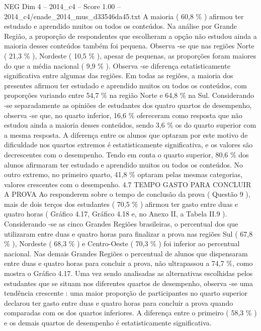 \begin{textsample}{NEG Dim 4 – 2014\_c4 – Score 1.00 – 2014\_c4/enade\_2014\_mus\_d33546da45.txt}
A maioria ( 60,8 \% ) afirmou ter estudado e aprendido muitos ou todos os conteúdos.
Na análise por Grande Região, a proporção de respondentes que escolheram a opção não estudou ainda a maioria desses conteúdos também foi pequena.
Observa -se que nas regiões Norte ( 21,3 \% ), Nordeste ( 10,5 \% ), apesar de pequenas, as proporções foram maiores do que a média nacional ( 9,9 \% ).
Observa -se diferença estatisticamente significativa entre algumas das regiões.
Em todas as regiões, a maioria dos presentes afirmou ter estudado e aprendido muitos ou todos os conteúdos, com proporções variando entre 54,7 \% na região Norte e 64,8 \% na Sul.
Considerando -se separadamente as opiniões de estudantes dos quatro quartos de desempenho, observa -se que, no quarto inferior, 16,6 \% ofereceram como resposta que não estudou ainda a maioria desses conteúdos, sendo 3,6 \% os do quarto superior com a mesma resposta.
A diferença entre os alunos que optaram por este motivo de dificuldade nos quartos extremos é estatisticamente significativa, e os valores são decrescentes com o desempenho.
Tendo em conta o quarto superior, 80,6 \% dos alunos afirmaram ter estudado e aprendido muitos ou todos os conteúdos.
No outro extremo, no primeiro quarto, 41,8 \% optaram pelas mesmas categorias, valores crescentes com o desempenho. 4.7 TEMPO GASTO PARA CONCLUIR A PROVA Ao responderem sobre o tempo de conclusão da prova ( Questão 9 ), mais de dois terços dos estudantes ( 70,5 \% ) afirmou ter gasto entre duas e quatro horas ( Gráfico 4.17, Gráfico 4.18 e, no Anexo II, a Tabela II.9 ).
Considerando -se as cinco Grandes Regiões brasileiras, o percentual dos que utilizaram entre duas e quatro horas para finalizar a prova nas regiões Sul ( 67,8 \% ), Nordeste ( 68,3 \% ) e Centro-Oeste ( 70,3 \% ) foi inferior ao percentual nacional.
Nas demais Grandes Regiões o percentual de alunos que dispensaram entre duas e quatro horas para concluir a prova, não ultrapassou a 74,7 \%, como mostra o Gráfico 4.17.
Uma vez sendo analisadas as alternativas escolhidas pelos estudantes que se situam nos diferentes quartos de desempenho, observa -se uma tendência crescente : uma maior proporção de participantes no quarto superior declarou ter gasto entre duas e quatro horas para concluir a prova quando comparadas com os dos quartos inferiores.
A diferença entre o primeiro ( 58,3 \% ) e os demais quartos de desempenho é estatisticamente significativa.

\end{textsample}

